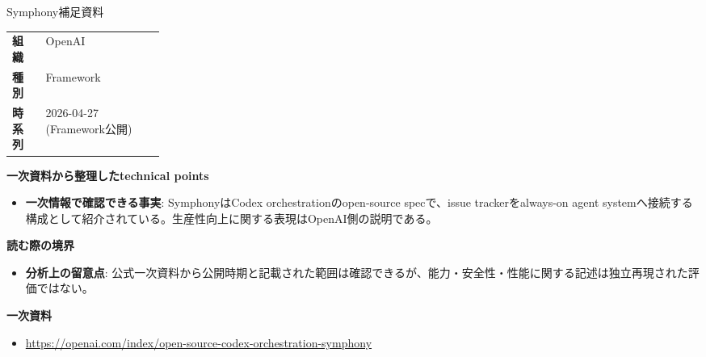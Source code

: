 \begin{technicalnote}{Symphony}{補足資料}
\begingroup
\begin{tabularx}{\linewidth}{@{}>{\bfseries}p{0.22\linewidth}X@{}}
組織 & OpenAI \\
種別 & Framework \\
時系列 & 2026-04-27 (Framework公開) \\
\end{tabularx}
\smallskip
{\bfseries 一次資料から整理したtechnical points}
\begin{itemize}[leftmargin=1.5em,itemsep=0.35em]
\item \textbf{一次情報で確認できる事実}: SymphonyはCodex orchestrationのopen-source specで、issue trackerをalways-on agent systemへ接続する構成として紹介されている。生産性向上に関する表現はOpenAI側の説明である。
\end{itemize}
{\bfseries 読む際の境界}
\begin{itemize}[leftmargin=1.5em,itemsep=0.35em]
\item \textbf{分析上の留意点}: 公式一次資料から公開時期と記載された範囲は確認できるが、能力・安全性・性能に関する記述は独立再現された評価ではない。
\end{itemize}
\begin{samepage}
{\bfseries 一次資料}
\begingroup\sloppy
\begin{itemize}[leftmargin=1.5em,itemsep=0.25em]
\item {\scriptsize\url{https://openai.com/index/open-source-codex-orchestration-symphony}}
\end{itemize}
\endgroup
\end{samepage}
\endgroup
\end{technicalnote}
\medskip
